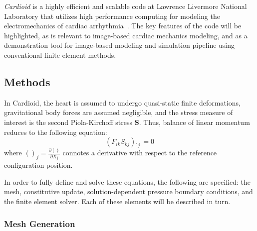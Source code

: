 \textit{Cardioid} is a highly efficient and scalable code at Lawrence Livermore National Laboratory that utilizes high performance computing for modeling the electromechanics of cardiac arrhythmia~\cite{richards_2013, gurev_2015}. The key features of the code will be highlighted, as is relevant to image-based cardiac mechanics modeling, and as a demonstration tool for image-based modeling and simulation pipeline using conventional finite element methods.

\subsection{Methods}
\label{Methods}

In Cardioid, the heart is assumed to undergo quasi-static finite deformations, gravitational body forces are assumed negligible, and the stress measure of interest is the second Piola-Kirchoff stress $\bm{S}$. Thus, balance of linear momentum reduces to the following equation:
\begin{equation}
(F_{ik}S_{kj}),_{j} = 0
\end{equation}
where $()_j = \frac{\partial ()}{\partial X_j}$ connotes a derivative with respect to the reference configuration position.

In order to fully define and solve these equations, the following are specified: the mesh, constitutive update, solution-dependent pressure boundary conditions, and the finite element solver. Each of these elements will be described in turn.

\subsubsection{Mesh Generation}
\label{Mesh Generation}

